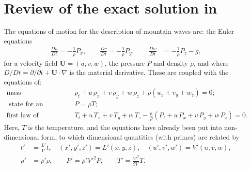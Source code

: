 \documentclass[reqno]{amsart}
\newcommand{\bu}{\mathbf{U}}             %
\begin{document}
\section{Review of the exact solution in \texorpdfstring{\cite{ConstantinMountain2023}}{Constantin et al. (2023)}}\label{model}
\noindent The equations of motion for the description of mountain waves are: the Euler equations 
\begin{equation}\label{eq:Euler2}
\begin{aligned}
\frac{Du}{Dt}= -\frac{1}{\rho} P_x, \qquad
\frac{D v}{Dt}= -\frac{1}{\rho} P_y, \qquad\frac{D w}{Dt} &= -\frac{1}{\rho} P_z - g,
\end{aligned}\end{equation}
for a velocity field $\bu =(u,v,w)$, the pressure $P$ and density $\rho$, and where ${D}/{Dt}={\partial}/{\partial t} + \bu \cdot \nabla$ is the material derivative. These are coupled with the equations of: 
\begin{align}\text{mass conservation}&\qquad \rho_t + u\,\rho_x + v\,\rho_y + w\,\rho_z
+ \rho\left( u_x + v_y + w_z \right) = 0;\label{mass} \\
				\text{ state for an ideal gas}&\qquad
                 \label{gas} P=\rho { T};\\
                 \text{first law of thermodynamics}&\qquad
T_t + u\,T_x + v\,T_y + w\,T_z
- \frac{\kappa}{\rho}\left( P_t + u\,P_x + v\,P_y + w\,P_z \right) = 0.\label{eq:thermolaw} \end{align}
Here, $T$ is the temperature, and the equations have already been put into non-dimensional form, to which dimensional quantities (with primes) are related by
\begin{equation}\begin{aligned}
	t' &= \frac{L'}{V'} t,\quad (x',y',z') = L' (x,y,z),\quad (u',v',w') = V' (u,v,w),\\
	\rho' &= \bar\rho' \rho, \qquad P' = \bar\rho' V'^2 P,\qquad T' = \frac{V'^2}{\mathfrak R'} T.\end{aligned}
\end{equation}
\end{document}

